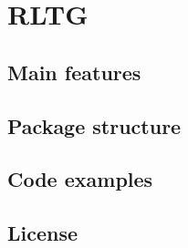 \chapter{RLTG}

\section{Main features}
 
\section{Package structure}
 
\section{Code examples}
 
\section{License}
 